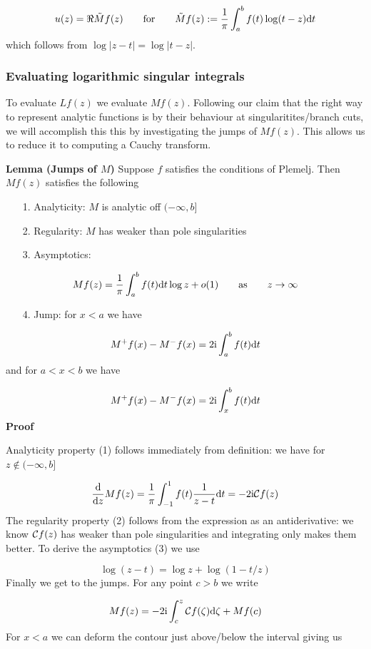 \documentclass[12pt,a4paper]{article}
\def\qqfor{\qquad\hbox{for}\qquad}
\def\qqas{\qquad\hbox{as}\qquad}
\def\D{ {\rm d} }
\def\I{ {\rm i} }
\def\CC{ {\cal C} }
\def\dt{\D t}
\begin{document}
\[
    u(z) = \Re \tilde Mf(z) \qqfor  \tilde Mf(z) := {1 \over \pi} \int_a^b f(t) \log ( t-z) \dt
\]
which follows from $\log|z-t| = \log|t-z|$.

\subsubsection{Evaluating logarithmic singular integrals}
To evaluate $L f(z)$ we evaluate $M f(z)$. Following our claim that the right way to represent analytic functions is by their behaviour at singularitites/branch cuts, we will accomplish this this by investigating the jumps of $M f(z)$. This allows us to reduce it to computing a Cauchy  transform.

\textbf{Lemma (Jumps of $M$)} Suppose $f$ satisfies the conditions of Plemelj. Then $M f(z)$ satisfies the following

\begin{itemize}
\item[1. ] Analyticity: $M$ is analytic off $(-\infty,b]$


\item[2. ] Regularity: $M$ has weaker than pole singularities


\item[3. ] Asymptotics: 

\end{itemize}
\[
Mf(z) = {1 \over \pi} \int_a^b f(t) \D t \log z + o(1) \qqas z \rightarrow \infty
\]
\begin{itemize}
\item[4. ] Jump: for $x < a$ we have

\end{itemize}
\[
M^+f(x) - M^-f(x) = 2 \I \int_a^b f(t) \D t
\]
and for $a < x < b$ we have

\[
M^+ f(x) - M^-f(x) = 2 \I \int_x^b f(t) \D t
\]
\textbf{Proof}

Analyticity property (1) follows immediately from definition: we have for $z \notin (-\infty,b]$

\[
{\D \over \D z} M f(z) = {1 \over \pi} \int_{-1}^1 f(t) {1\over z -t}  \dt = -2 \I \CC f(z)
\]
The regularity property (2) follows from the expression as an antiderivative: we know $\CC f(z)$ has weaker than pole singularities and integrating only makes them better. To derive the asymptotics (3) we use

\[
\log(z - t) = \log z + \log(1 - t/z)
\]
Finally we get to the jumps. For any point $c > b$ we write 

\[
M f(z) = -2 \I \int_c^z \CC f(\zeta) \D \zeta + M f(c)
\]
For $x < a$ we can deform the contour just above/below the interval giving us
\end{document}
